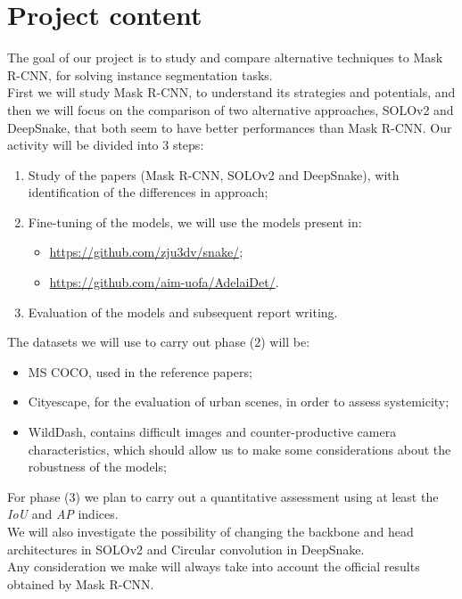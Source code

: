 
\section*{Project content}
The goal of our project is to study and compare alternative techniques to Mask R-CNN, for solving instance segmentation tasks.\\
First we will study Mask R-CNN, to understand its strategies and potentials, and then we will focus on the comparison of two alternative approaches, SOLOv2 and DeepSnake, that both seem to have better performances than Mask R-CNN. Our activity will be divided into 3 steps:
\begin{enumerate}
\item Study of the papers (Mask R-CNN, SOLOv2 and DeepSnake), with identification of the differences in approach;
\item Fine-tuning of the models, we will use the models present in:
\begin{itemize}
\item \url{https://github.com/zju3dv/snake/};
\item \url{https://github.com/aim-uofa/AdelaiDet/}.
\end{itemize}
\noindent
\item Evaluation of the models and subsequent report writing.
\end{enumerate}
\noindent
The datasets we will use to carry out phase (2) will be:
\begin{itemize}
\item MS COCO, used in the reference papers;
\item Cityescape, for the evaluation of urban scenes, in order to assess systemicity;
\item WildDash, contains difficult images and counter-productive camera characteristics, which should allow us to make some considerations about the robustness of the models;
\end{itemize}
\noindent
For phase (3) we plan to carry out a quantitative assessment using at least the \textit{IoU} and \textit{AP} indices.\\
We will also investigate the possibility of changing the backbone and head architectures in SOLOv2 and Circular convolution in DeepSnake.\\
Any consideration we make will always take into account the official results obtained by Mask R-CNN.

